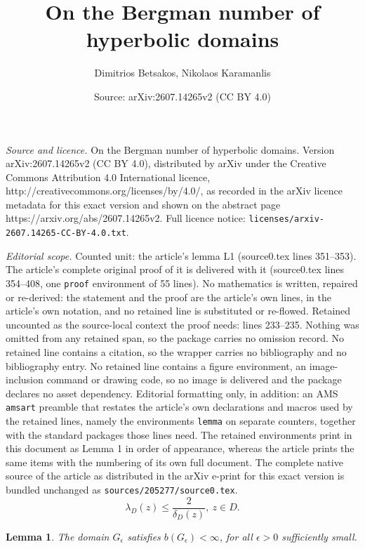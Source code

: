 \documentclass[10pt,a4paper]{amsart}
\title{On the Bergman number of hyperbolic domains}
\author{Dimitrios Betsakos, Nikolaos Karamanlis}
\date{Source: arXiv:2607.14265v2 (CC BY 4.0)}
\newtheorem{lemma}{Lemma}
\begin{document}
\maketitle

\noindent\emph{Source and licence.} On the Bergman number of hyperbolic domains. Version arXiv:2607.14265v2 (CC BY 4.0), distributed by arXiv under the Creative Commons Attribution 4.0 International licence, http://creativecommons.org/licenses/by/4.0/, as recorded in the arXiv licence metadata for this exact version and shown on the abstract page https://arxiv.org/abs/2607.14265v2. Full licence notice: \texttt{licenses/arxiv-2607.14265-CC-BY-4.0.txt}.\par\smallskip

\noindent\textit{Editorial scope.} Counted unit: the article's lemma L1 (source0.tex lines 351--353). The article's complete original proof of it is delivered with it (source0.tex lines 354--408, one \texttt{proof} environment of 55 lines). No mathematics is written, repaired or re-derived: the statement and the proof are the article's own lines, in the article's own notation, and no retained line is substituted or re-flowed.  Retained uncounted as the source-local context the proof needs: lines 233--235.  Nothing was omitted from any retained span, so the package carries no omission record.  No retained line contains a citation, so the wrapper carries no bibliography and no bibliography entry.  No retained line contains a figure environment, an image-inclusion command or drawing code, so no image is delivered and the package declares no asset dependency.  Editorial formatting only, in addition: an AMS \texttt{amsart} preamble that restates the article's own declarations and macros used by the retained lines, namely the environments \texttt{lemma} on separate counters, together with the standard packages those lines need.  The retained environments print in this document as Lemma 1 in order of appearance, whereas the article prints the same items with the numbering of its own full document.  The complete native source of the article as distributed in the arXiv e-print for this exact version is bundled unchanged as \texttt{sources/205277/source0.tex}.
\begin{equation}\label{upperlambda}
	\lambda_D(z)\leq\frac{2}{\delta_D(z)}, \ z\in D.
\end{equation}

\begin{lemma}\label{L1}
The domain $G_\epsilon$ satisfies $b(G_\epsilon)<\infty$, for all $\epsilon>0$ sufficiently small.
\end{lemma}
\end{document}
